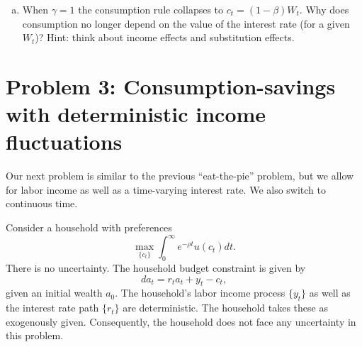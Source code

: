 \documentclass[11pt]{extarticle}
\theoremstyle{plain}
\theoremstyle{definition}
\begin{document}
\begin{enumerate}[(a)]
\item When $\gamma = 1$ the consumption rule collapses to $c_t = (1-\beta) W_t$. Why does consumption no longer depend on the value of the interest rate (for a given $W_t$)? Hint: think about income effects and substitution effects.
\end{enumerate}




\newpage
\section*{Problem 3: Consumption-savings with deterministic income fluctuations}

Our next problem is similar to the previous ``eat-the-pie'' problem, but we allow for labor income as well as a time-varying interest rate. We also switch to continuous time. 


Consider a household with preferences 
\begin{equation*}
	\max_{\{c_t\}} \int_0^\infty e^{- \rho t} u(c_t) dt. 
\end{equation*}
There is no uncertainty. The household budget constraint is given by
\begin{equation*}
	da_t = r_t a_t + y_t - c_t, 
\end{equation*}
given an initial wealth $a_0$. The household's labor income process $\{y_t\}$ as well as the interest rate path $\{r_t\}$ are deterministic. The household takes these as exogenously given. Consequently, the household does not face any uncertainty in this problem. 
\end{document}

